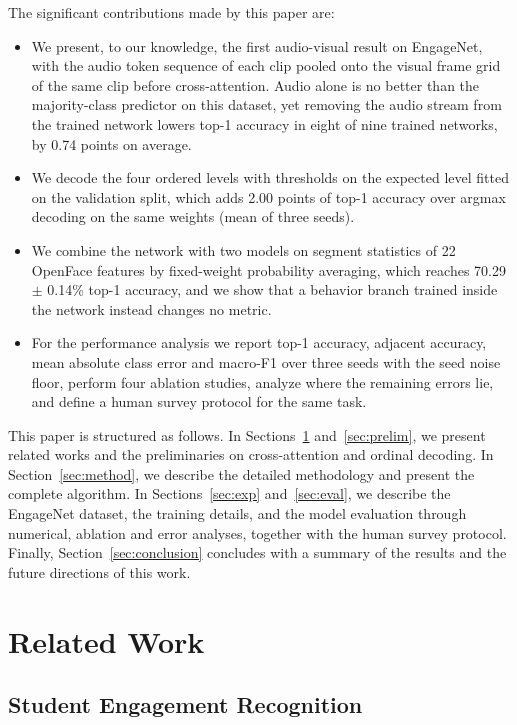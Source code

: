 \documentclass[journal]{IEEEtran}
\begin{document}
The significant contributions made by this paper are:
\begin{itemize}
\item We present, to our knowledge, the first audio-visual result on EngageNet, with the audio token sequence of each clip pooled onto the visual frame grid of the same clip before cross-attention. Audio alone is no better than the majority-class predictor on this dataset, yet removing the audio stream from the trained network lowers top-1 accuracy in eight of nine trained networks, by 0.74 points on average.
\item We decode the four ordered levels with thresholds on the expected level fitted on the validation split, which adds 2.00 points of top-1 accuracy over argmax decoding on the same weights (mean of three seeds).
\item We combine the network with two models on segment statistics of 22 OpenFace features by fixed-weight probability averaging, which reaches 70.29 $\pm$ 0.14\% top-1 accuracy, and we show that a behavior branch trained inside the network instead changes no metric.
\item For the performance analysis we report top-1 accuracy, adjacent accuracy, mean absolute class error and macro-F1 over three seeds with the seed noise floor, perform four ablation studies, analyze where the remaining errors lie, and define a human survey protocol for the same task.
\end{itemize}

This paper is structured as follows. In Sections~\ref{sec:relwork} and~\ref{sec:prelim}, we present related works and the preliminaries on cross-attention and ordinal decoding. In Section~\ref{sec:method}, we describe the detailed methodology and present the complete algorithm. In Sections~\ref{sec:exp} and~\ref{sec:eval}, we describe the EngageNet dataset, the training details, and the model evaluation through numerical, ablation and error analyses, together with the human survey protocol. Finally, Section~\ref{sec:conclusion} concludes with a summary of the results and the future directions of this work.

\section{Related Work}
\label{sec:relwork}

\subsection{Student Engagement Recognition}
\end{document}
